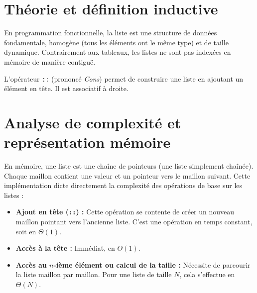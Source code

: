 \documentclass{article}
\begin{document}

\section{Théorie et définition inductive}

En programmation fonctionnelle, la liste est une structure de données fondamentale, homogène (tous les éléments ont le même type) et de taille dynamique. Contrairement aux tableaux, les listes ne sont pas indexées en mémoire de manière contiguë.


\noindent L'opérateur \texttt{::} (prononcé \textit{Cons}) permet de construire une liste en ajoutant un élément en tête. Il est associatif à droite.



\section{Analyse de complexité et représentation mémoire}

En mémoire, une liste est une chaîne de pointeurs (une liste simplement chaînée). Chaque maillon contient une valeur et un pointeur vers le maillon suivant. Cette implémentation dicte directement la complexité des opérations de base sur les listes :

\begin{itemize}
    \item \textbf{Ajout en tête (\texttt{::}) :} Cette opération se contente de créer un nouveau maillon pointant vers l'ancienne liste. C'est une opération en temps constant, soit en $\Theta(1)$.
    \item \textbf{Accès à la tête :} Immédiat, en $\Theta(1)$.
    \item \textbf{Accès au $n$-ième élément ou calcul de la taille :} Nécessite de parcourir la liste maillon par maillon. Pour une liste de taille $N$, cela s'effectue en $\Theta(N)$.
\end{itemize}
\end{document}
